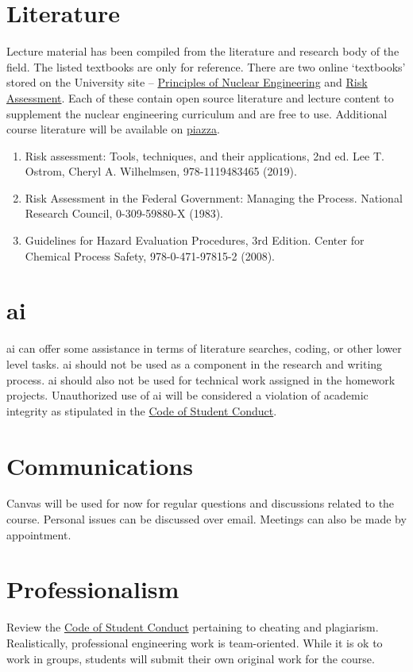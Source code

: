\documentclass[11pt,letterpaper]{article}
\newcommand{\acl}{\acrlong} %
\newcommand{\acs}{\acrshort} %
\begin{document}
\section{Literature} 
Lecture material has been compiled from the literature and research body of the field. The listed textbooks are only for reference. There are two online `textbooks' stored on the University site -- \href{https://uidaho.pressbooks.pub/nuclearengineering/}{Principles of Nuclear Engineering} and \href{https://uidaho.pressbooks.pub/riskassessment/}{Risk Assessment}. Each of these contain open source literature and lecture content to supplement the nuclear engineering curriculum and are free to use. Additional course literature will be available on \href{https://piazza.com/}{piazza}. 
\begin{enumerate}[item-label=(\arabic*)]
    \item Risk assessment: Tools, techniques, and their applications, 2nd ed. Lee T. Ostrom, Cheryl A. Wilhelmsen, 978-1119483465 (2019).
    \item Risk Assessment in the Federal Government: Managing the Process. National Research Council, 0-309-59880-X (1983).
    \item Guidelines for Hazard Evaluation Procedures, 3rd Edition. Center for Chemical Process Safety, 978-0-471-97815-2 (2008). 
\end{enumerate}


\section{\acl{ai}}
\acs{ai} can offer some assistance in terms of literature searches, coding, or other lower level tasks. \acs{ai} should not be used as a component in the research and writing process. \acs{ai} should also not be used for technical work assigned in the homework projects. Unauthorized use of \acs{ai} will be considered a violation of academic integrity as stipulated in the \href{http://www.uidaho.edu/student-affairs/dean-of-students/student-conduct/student-code-of-conduct}{Code of Student Conduct}.


\section{Communications}
Canvas will be used for now for regular questions and discussions related to the course. Personal issues can be discussed over email. Meetings can also be made by appointment. 


\section{Professionalism}
Review the \href{http://www.uidaho.edu/student-affairs/dean-of-students/student-conduct/student-code-of-conduct}{Code of Student Conduct} pertaining to cheating and plagiarism. Realistically, professional engineering work is team-oriented. While it is ok to work in groups, students will submit their own original work for the course. 
\end{document}
